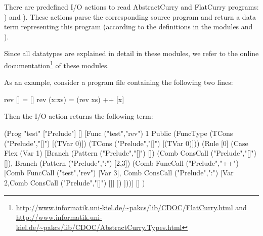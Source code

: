 {There are predefined I/O actions to read AbstractCurry and
FlatCurry programs: )
and ).
These actions parse the corresponding source program and return
a data term representing this program (according to the definitions
in the modules  and ).

Since all datatypes are explained in detail in these modules,
we refer to the online documentation\footnote{%
\url{http://www.informatik.uni-kiel.de/~pakcs/lib/CDOC/FlatCurry.html} and
\url{http://www.informatik.uni-kiel.de/~pakcs/lib/CDOC/AbstractCurry.Types.html}}
of these modules.

As an example, consider a program file 
containing the following two lines:
\begin{curry}
rev []     = []
rev (x:xs) = (rev xs) ++ [x]
\end{curry}
Then the I/O action  returns the
following term:
\begin{curry}
 (Prog "test"
  ["Prelude"]
  []
  [Func ("test","rev") 1 Public
        (FuncType (TCons ("Prelude","[]") [(TVar 0)])
                  (TCons ("Prelude","[]") [(TVar 0)]))
        (Rule [0]
           (Case Flex (Var 1)
              [Branch (Pattern ("Prelude","[]") [])
                  (Comb ConsCall ("Prelude","[]") []),
               Branch (Pattern ("Prelude",":") [2,3])
                  (Comb FuncCall ("Prelude","++")
                        [Comb FuncCall ("test","rev") [Var 3],
                         Comb ConsCall ("Prelude",":")
                              [Var 2,Comb ConsCall ("Prelude","[]") []]
                        ])
              ]))]
  []
 )
\end{curry}



}
